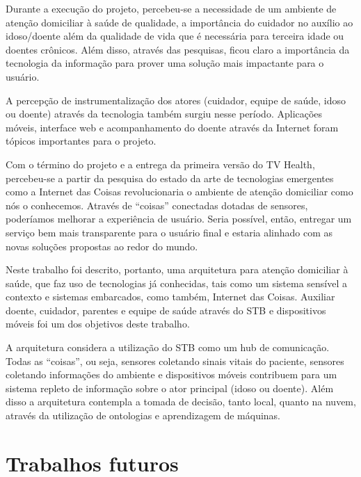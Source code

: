 Durante a execução do projeto, percebeu-se a necessidade de um ambiente de
atenção domiciliar à saúde de qualidade, a importância do cuidador no auxílio
ao idoso/doente além da qualidade de vida que é necessária para terceira idade
ou doentes crônicos. Além disso, através das pesquisas, ficou claro a
importância da tecnologia da informação para prover uma solução mais impactante
para o usuário. 

A percepção de instrumentalização dos atores (cuidador, equipe de saúde, idoso
ou doente) através da tecnologia também surgiu nesse período. Aplicações
móveis, interface web e acompanhamento do doente através da Internet foram
tópicos importantes para o projeto.

Com o término do projeto \nextsaude[] e a entrega da primeira versão do TV Health,
percebeu-se a partir da pesquisa do estado da arte de tecnologias emergentes
como a Internet das Coisas revolucionaria o ambiente de atenção domiciliar como
nós o conhecemos. Através de ``coisas'' conectadas dotadas de sensores,
poderíamos melhorar a experiência de usuário. Seria possível, então, entregar
um serviço bem mais transparente para o usuário final e estaria alinhado com as
novas soluções propostas ao redor do mundo.

Neste trabalho foi descrito, portanto, uma arquitetura para atenção domiciliar
à saúde, que faz uso de tecnologias já conhecidas, tais como um sistema
sensível a contexto e sistemas embarcados, como também, Internet das Coisas.
Auxiliar doente, cuidador, parentes e equipe de saúde através do STB e
dispositivos móveis foi um dos objetivos deste trabalho. 

A arquitetura considera a utilização do STB como um hub de comunicação. Todas
as ``coisas'', ou seja, sensores coletando sinais vitais do paciente, sensores
coletando informações do ambiente e dispositivos móveis contribuem para um
sistema repleto de informação sobre o ator principal (idoso ou doente). Além
disso a arquitetura contempla a tomada de decisão, tanto local, quanto na
nuvem, através da utilização de ontologias e aprendizagem de máquinas.



\section{Trabalhos futuros} \label{sec:trabalhos-futuros}

